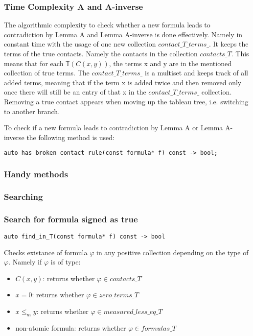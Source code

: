\documentclass{article}
\begin{document}
	\subsubsection*{Time Complexity A and A-inverse}
	The algorithmic complexity to check whether a new formula leads to contradiction by Lemma A and Lemma A-inverse is done effectively. Namely in constant time with the usage of one new collection $contact\_T\_terms\_$. It keeps the terms of the true contacts. Namely the contacts in the collection $contacts\_T$. This means that for each $\mathbb{T}(C(x, y))$, the terms x and y are in the mentioned collection of true terms. The $contact\_T\_terms\_$  is a multiset and keeps track of all added terms, meaning that if the term x is added twice and then removed only once there will still be an entry of that x in the $contact\_T\_terms\_$ collection. Removing a true contact appears when moving up the tableau tree, i.e. switching to another branch.

	To check if a new formula leads to contradiction by Lemma A or Lemma A-inverse the following method is used:
\begin{lstlisting}
auto has_broken_contact_rule(const formula* f) const -> bool;
\end{lstlisting}

	\subsubsection{Handy methods}
	\subsubsection*{Searching}
	\subsubsection*{Search for formula signed as true}
\begin{lstlisting}
auto find_in_T(const formula* f) const -> bool
\end{lstlisting}
	Checks existance of formula $\varphi$ in any positive collection depending on the type of $\varphi$. Namely if $\varphi$ is of type:
	\begin{itemize}
		\item $C(x, y)$: returns whether $\varphi \in contacts\_T$
		\item $x = 0$: returns whether $\varphi \in zero\_terms\_T$
		\item $x \le_m y$: returns whether $\varphi \in measured\_less\_eq\_T$
		\item non-atomic formula: returns whether $\varphi \in formulas\_T$
	\end{itemize}
\end{document}
